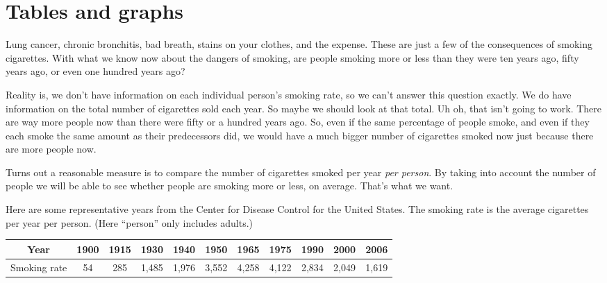 
\section{Tables and graphs}




Lung cancer, chronic bronchitis, bad breath, stains on your clothes, and the expense.  These are just a few of the consequences of smoking cigarettes. With what we know now about the dangers of smoking, are people smoking more or less than they were ten years ago, fifty years ago, or even one hundred years ago?  

Reality is, we don't have information on each individual person's smoking rate, so we can't answer this question exactly.  We do have information on the total number of cigarettes sold each year.  So maybe we should look at that total. Uh oh, that isn't going to work.  There are way more people now than there were fifty or a hundred years ago.  So, even if the same percentage of people smoke, and even if they each smoke the same amount as their predecessors did, we would have a much bigger number of cigarettes smoked now just because there are more people now.  

Turns out a reasonable measure is to compare the number of cigarettes smoked per year \emph{per person}.  By taking into account the number of people we will be able to see whether people are smoking more or less, on average. That's what we want.  

Here are some representative years from the Center for Disease Control for the United States. 
 The smoking rate is the average cigarettes per year per person.  (Here ``person'' only includes adults.)
\begin{center}
\begin{tabular} {|c| |c|c|c|c|c|c|c|c|c|c|} \hline
Year & 1900 & 1915 & 1930 & 1940 & 1950 & 1965 & 1975 & 1990 & 2000 & 2006 \\ \hline
Smoking rate & 54 & 285 & 1,485& 1,976 & 3,552 &  4,258 &  4,122 &  2,834 &  2,049 &  1,619 \\ \hline
\end{tabular}
\end{center}
\bigskip 

